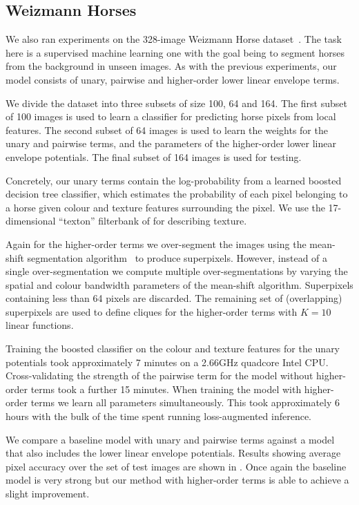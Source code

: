 \documentclass[10pt,journal,letterpaper,compsoc]{IEEEtran}
\renewcommand{\citename}{\citet}
\renewcommand{\cite}{\citep}
\begin{document}
\subsection{Weizmann Horses}

We also ran experiments on the 328-image Weizmann Horse
dataset~\cite{Borenstein:ECCV02, Borenstein:CVPR04}. The task here is
a supervised machine learning one with the goal being to segment
horses from the background in unseen images. As with the previous
experiments, our model consists of unary, pairwise and higher-order
lower linear envelope terms.

We divide the dataset into three subsets of size 100, 64 and 164. The
first subset of 100 images is used to learn a classifier for
predicting horse pixels from local features. The second subset of 64
images is used to learn the weights for the unary and pairwise terms,
and the parameters of the higher-order lower linear envelope
potentials. The final subset of 164 images is used for testing.

Concretely, our unary terms contain the log-probability from a
learned boosted decision tree classifier, which estimates the
probability of each pixel belonging to a horse given colour and
texture features surrounding the pixel. We use the 17-dimensional
``texton'' filterbank of \citename{Shotton:ECCV06} for describing
texture.

Again for the higher-order terms we over-segment the images using the
mean-shift segmentation algorithm~\cite{Comaniciu:PAMI02} to produce
superpixels. However, instead of a single over-segmentation we compute
multiple over-segmentations by varying the spatial and colour
bandwidth parameters of the mean-shift algorithm. Superpixels
containing less than 64 pixels are discarded. The remaining set of
(overlapping) superpixels are used to define cliques for the
higher-order terms with $K = 10$ linear functions.

Training the boosted classifier on the colour and texture features for
the unary potentials took approximately 7 minutes on a 2.66GHz
quadcore Intel CPU. Cross-validating the strength of the pairwise term
for the model without higher-order terms took a further 15
minutes. When training the model with higher-order terms we learn all
parameters simultaneously. This took approximately 6 hours with the
bulk of the time spent running loss-augmented inference.

We compare a baseline model with unary and pairwise terms against a
model that also includes the lower linear envelope potentials. Results
showing average pixel accuracy over the set of test images are shown
in . Once again the baseline model is
very strong but our method with higher-order terms is able to achieve
a slight improvement.
\end{document}
